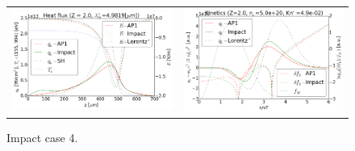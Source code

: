 \begin{figure}[tbh]
  \begin{center}
    \begin{tabular}{cc}
      \includegraphics[width=\figscale\textwidth]{../VFPdata/C7_Impact_case4_heatflux.png} &
      \includegraphics[width=\figscale\textwidth]{../VFPdata/C7_Impact_case4_kinetics.png}
    \end{tabular}
  \caption{  
  Impact case 4.}
  \end{center}
  \label{fig:C7_Impact_case4}
\end{figure}

